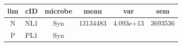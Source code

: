 \documentclass[]{article}
\begin{document}
\begin{longtable}[]{@{}cccccc@{}}
\toprule
\begin{minipage}[b]{0.07\columnwidth}\centering\strut
lim
\strut\end{minipage} &
\begin{minipage}[b]{0.07\columnwidth}\centering\strut
cID
\strut\end{minipage} &
\begin{minipage}[b]{0.12\columnwidth}\centering\strut
microbe
\strut\end{minipage} &
\begin{minipage}[b]{0.10\columnwidth}\centering\strut
mean
\strut\end{minipage} &
\begin{minipage}[b]{0.12\columnwidth}\centering\strut
var
\strut\end{minipage} &
\begin{minipage}[b]{0.12\columnwidth}\centering\strut
sem
\strut\end{minipage}\tabularnewline
\midrule
\endhead
\begin{minipage}[t]{0.07\columnwidth}\centering\strut
N
\strut\end{minipage} &
\begin{minipage}[t]{0.07\columnwidth}\centering\strut
NL1
\strut\end{minipage} &
\begin{minipage}[t]{0.12\columnwidth}\centering\strut
Syn
\strut\end{minipage} &
\begin{minipage}[t]{0.10\columnwidth}\centering\strut
13134483
\strut\end{minipage} &
\begin{minipage}[t]{0.12\columnwidth}\centering\strut
4.093e+13
\strut\end{minipage} &
\begin{minipage}[t]{0.12\columnwidth}\centering\strut
3693536
\strut\end{minipage}\tabularnewline
\begin{minipage}[t]{0.07\columnwidth}\centering\strut
P
\strut\end{minipage} &
\begin{minipage}[t]{0.07\columnwidth}\centering\strut
PL1
\strut\end{minipage} &
\begin{minipage}[t]{0.12\columnwidth}\centering\strut
Syn
\strut\end{minipage} &
\begin{minipage}[t]{0.10\columnwidth}\centering\strut

\end{minipage}
\end{longtable}
\end{document}
